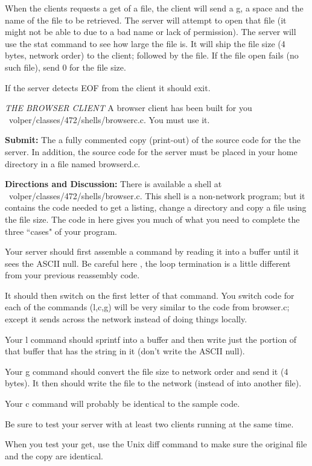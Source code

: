 When the clients requests a get of a file,
the client will send a g, a space and the name of the file to be retrieved. 
The server will attempt to open that file (it might not be able
to due to a bad name or lack of permission).
The server will use the {\ltt{}stat} command to see how large the
file is.
It will ship the file size (4 bytes, network order) to the client;
followed by the file.
If the file open fails (no such file), send 0 for the file size.

If the server detects EOF from the client it should exit.

{\it THE BROWSER CLIENT}
\hfill\break
A browser client has been built for you
{\ltt{}~volper/classes/472/shells/browserc.c}.
You must use it.

{\bf Submit:} The a fully commented copy (print-out) of the source code for the 
the server.
In addition,
the source code for the server must be placed in your home directory
in a file named {\ltt{}browserd.c}.

{\bf Directions and Discussion:} 
There is available a shell at
{\ltt{}~volper/classes/472/shells/browser.c}. 
This shell is a non-network program; but it
contains the code needed to get a listing, change
a directory and copy a file using the file size.
The code in here gives you much of what you need to
complete the three ``cases" of your program.

Your server should first assemble a command by reading it into a buffer
until it sees the ASCII null.
Be careful here , the loop termination is a little different from
your previous reassembly code.

It should then switch on the first letter of that command.
You switch code for each of the commands (l,c,g) will
be very similar to the code from browser.c; except
it sends across the network instead of doing things locally. 

Your l command should {\ltt{}sprintf} into
a buffer and then write just the portion of that buffer that
has the string in it (don't write the ASCII null).

Your g command should convert the file size to network order and
send it (4 bytes).
It then should  write the file to the network (instead of into
another file).

Your c command will probably be identical to the sample code.

Be sure to test your server with at least two clients running
at the same time.

When you test your get, use the Unix {\ltt{}diff} command
to make sure the original file and the copy are identical.
\bye
